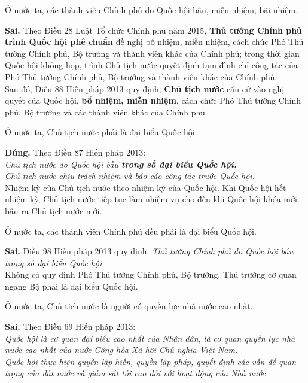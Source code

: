 \begin{ques}
Ở nước ta, các thành viên Chính phủ do Quốc hội bầu, miễn nhiệm, bãi nhiệm.
\end{ques}
\begin{ans}
\textbf{Sai.} Theo Điều 28 Luật Tổ chức Chính phủ năm 2015, \textbf{Thủ tướng Chính phủ trình Quốc hội phê chuẩn} đề nghị bổ nhiệm, miễn nhiệm, cách chức Phó Thủ tướng Chính phủ, Bộ trưởng và thành viên khác của Chính phủ; trong thời gian Quốc hội không họp, trình Chủ tịch nước quyết định tạm đình chỉ công tác của Phó Thủ tướng Chính phủ, Bộ trưởng và thành viên khác của Chính phủ.\\
Sau đó, Điều 88 Hiến pháp 2013 quy định, \textbf{Chủ tịch nước} căn cứ vào nghị quyết của Quốc hội,\textbf{ bổ nhiệm, miễn nhiệm}, cách chức Phó Thủ tướng Chính phủ, Bộ trưởng và các thành viên khác của Chính phủ.
\end{ans}

\begin{ques}
Ở nước ta, Chủ tịch nước phải là đại biểu Quốc hội.
\end{ques}
\begin{ans}
\textbf{Đúng.} Theo Điều 87 Hiến pháp 2013:\\
\textit{Chủ tịch nước do Quốc hội bầu \textbf{trong số đại biểu Quốc hội.}}\\
\textit{Chủ tịch nước chịu trách nhiệm và báo cáo công tác trước Quốc hội.}\\
Nhiệm kỳ của Chủ tịch nước theo nhiệm kỳ của Quốc hội. Khi Quốc hội hết nhiệm kỳ, Chủ tịch nước tiếp tục làm nhiệm vụ cho đến khi Quốc hội khóa mới bầu ra Chủ tịch nước mới.
\end{ans}

\begin{ques}
Ở nước ta, các thành viên Chính phủ đều phải là đại biểu Quốc hội.
\end{ques}
\begin{ans}
\textbf{Sai.} Điều 98 Hiến pháp 2013 quy định: \textit{Thủ tướng Chính phủ do Quốc hội bầu trong số đại biểu Quốc hội.}\\
Không có quy định Phó Thủ tướng Chính phủ, Bộ trưởng, Thủ trưởng cơ quan ngang Bộ phải là đại biểu Quốc hội.
\end{ans}

\begin{ques}
Ở nước ta, Chủ tịch nước là người có quyền lực nhà nước cao nhất.
\end{ques}
\begin{ans}
\textbf{Sai.} Theo Điều 69 Hiến pháp 2013:\\
\textit{Quốc hội là cơ quan đại biểu cao nhất của Nhân dân, là cơ quan quyền lực nhà nước cao nhất của nước Cộng hòa Xã hội Chủ nghĩa Việt Nam.}\\
\textit{Quốc hội thực hiện quyền lập hiến, quyền lập pháp, quyết định các vấn đề quan trọng của đất nước và giám sát tối cao đối với hoạt động của Nhà nước.}
\end{ans}

